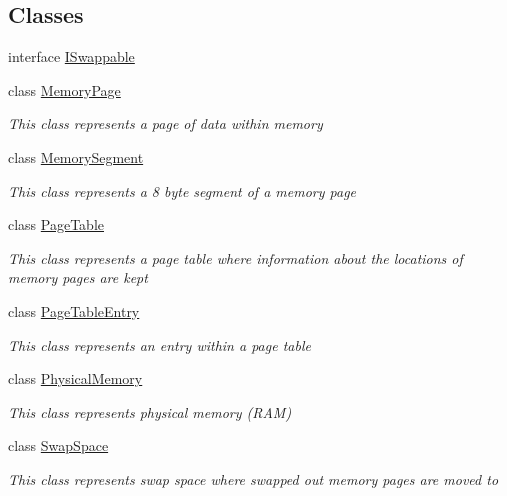 \subsection*{Classes}
\begin{DoxyCompactItemize}
\item 
interface \hyperlink{interface_c_p_u___o_s___simulator_1_1_memory_1_1_i_swappable}{I\+Swappable}
\item 
class \hyperlink{class_c_p_u___o_s___simulator_1_1_memory_1_1_memory_page}{Memory\+Page}
\begin{DoxyCompactList}\small\item\em This class represents a page of data within memory \end{DoxyCompactList}\item 
class \hyperlink{class_c_p_u___o_s___simulator_1_1_memory_1_1_memory_segment}{Memory\+Segment}
\begin{DoxyCompactList}\small\item\em This class represents a 8 byte segment of a memory page \end{DoxyCompactList}\item 
class \hyperlink{class_c_p_u___o_s___simulator_1_1_memory_1_1_page_table}{Page\+Table}
\begin{DoxyCompactList}\small\item\em This class represents a page table where information about the locations of memory pages are kept \end{DoxyCompactList}\item 
class \hyperlink{class_c_p_u___o_s___simulator_1_1_memory_1_1_page_table_entry}{Page\+Table\+Entry}
\begin{DoxyCompactList}\small\item\em This class represents an entry within a page table \end{DoxyCompactList}\item 
class \hyperlink{class_c_p_u___o_s___simulator_1_1_memory_1_1_physical_memory}{Physical\+Memory}
\begin{DoxyCompactList}\small\item\em This class represents physical memory (R\+A\+M) \end{DoxyCompactList}\item 
class \hyperlink{class_c_p_u___o_s___simulator_1_1_memory_1_1_swap_space}{Swap\+Space}
\begin{DoxyCompactList}\small\item\em This class represents swap space where swapped out memory pages are moved to \end{DoxyCompactList}\end{DoxyCompactItemize}
